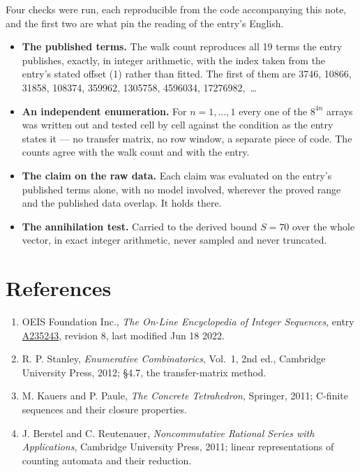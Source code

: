 \documentclass[11pt]{article}
\theoremstyle{definition}
\begin{document}
Four checks were run, each reproducible from the code accompanying this note, and the first two are what pin the reading of the entry's English.

\begin{itemize}

\item {\bfseries The published terms.} The walk count reproduces all 19 terms the entry publishes, exactly, in integer arithmetic, with the index taken from the entry's stated offset (1) rather than fitted. The first of them are 3746, 10866, 31858, 108374, 359962, 1305758, 4596034, 17276982,~\dots

\item {\bfseries An independent enumeration.} For $n = 1,\dots,1$ every one of the $8^{4n}$ arrays was written out and tested cell by cell against the condition as the entry states it --- no transfer matrix, no row window, a separate piece of code. The counts agree with the walk count and with the entry.

\item {\bfseries The claim on the raw data.} Each claim was evaluated on the entry's published terms alone, with no model involved, wherever the proved range and the published data overlap. It holds there.

\item {\bfseries The annihilation test.} Carried to the derived bound $S = 70$ over the whole vector, in exact integer arithmetic, never sampled and never truncated.

\end{itemize}

\section{References}

\begin{enumerate}

\item OEIS Foundation Inc., \emph{The On-Line Encyclopedia of Integer Sequences}, entry \href{https://oeis.org/A235243}{A235243}, revision 8, last modified Jun 18 2022.

\item R. P. Stanley, \emph{Enumerative Combinatorics}, Vol.~1, 2nd ed., Cambridge University Press, 2012; \S4.7, the transfer-matrix method.

\item M. Kauers and P. Paule, \emph{The Concrete Tetrahedron}, Springer, 2011; C-finite sequences and their closure properties.

\item J. Berstel and C. Reutenauer, \emph{Noncommutative Rational Series with Applications}, Cambridge University Press, 2011; linear representations of counting automata and their reduction.

\end{enumerate}
\end{document}
